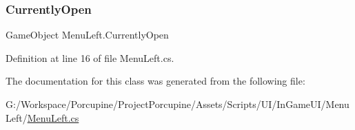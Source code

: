 \subsubsection{\texorpdfstring{Currently\+Open}{CurrentlyOpen}}
{\footnotesize\ttfamily Game\+Object Menu\+Left.\+Currently\+Open\hspace{0.3cm}{\ttfamily [get]}}



Definition at line 16 of file Menu\+Left.\+cs.



The documentation for this class was generated from the following file\+:\begin{DoxyCompactItemize}
\item 
G\+:/\+Workspace/\+Porcupine/\+Project\+Porcupine/\+Assets/\+Scripts/\+U\+I/\+In\+Game\+U\+I/\+Menu\+Left/\hyperlink{_menu_left_8cs}{Menu\+Left.\+cs}\end{DoxyCompactItemize}
